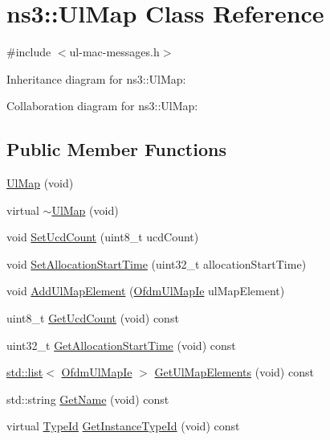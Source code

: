 \hypertarget{classns3_1_1UlMap}{}\section{ns3\+:\+:Ul\+Map Class Reference}
\label{classns3_1_1UlMap}


{\ttfamily \#include $<$ul-\/mac-\/messages.\+h$>$}



Inheritance diagram for ns3\+:\+:Ul\+Map\+:


Collaboration diagram for ns3\+:\+:Ul\+Map\+:
\subsection*{Public Member Functions}
\begin{DoxyCompactItemize}
\item 
\hyperlink{classns3_1_1UlMap_a2b5b85937a0faf66691f8a773d5a1d24}{Ul\+Map} (void)
\item 
virtual \hyperlink{classns3_1_1UlMap_afdc9021a7756c11506e0658915dcf712}{$\sim$\+Ul\+Map} (void)
\item 
void \hyperlink{classns3_1_1UlMap_a8e6ba0d4dd34afff774c28d7bc4b0222}{Set\+Ucd\+Count} (uint8\+\_\+t ucd\+Count)
\item 
void \hyperlink{classns3_1_1UlMap_a2119116e4d057fe2dc59bc2ee6bda0c8}{Set\+Allocation\+Start\+Time} (uint32\+\_\+t allocation\+Start\+Time)
\item 
void \hyperlink{classns3_1_1UlMap_a60637b23f7686167de08d43422abcad0}{Add\+Ul\+Map\+Element} (\hyperlink{classns3_1_1OfdmUlMapIe}{Ofdm\+Ul\+Map\+Ie} ul\+Map\+Element)
\item 
uint8\+\_\+t \hyperlink{classns3_1_1UlMap_ab92c61cd585ea6ab4770824655a45f55}{Get\+Ucd\+Count} (void) const 
\item 
uint32\+\_\+t \hyperlink{classns3_1_1UlMap_ae5fa32a7b7b058f2620799b8d15d47d4}{Get\+Allocation\+Start\+Time} (void) const 
\item 
\hyperlink{openflow-interface_8h_afd9bcfa176617760671b67580f536fa7}{std\+::list}$<$ \hyperlink{classns3_1_1OfdmUlMapIe}{Ofdm\+Ul\+Map\+Ie} $>$ \hyperlink{classns3_1_1UlMap_af8a25727ebe205054b2a53fea86a4ab8}{Get\+Ul\+Map\+Elements} (void) const 
\item 
std\+::string \hyperlink{classns3_1_1UlMap_ae742632b0965883a0f8f3a29629deacf}{Get\+Name} (void) const 
\item 
virtual \hyperlink{classns3_1_1TypeId}{Type\+Id} \hyperlink{classns3_1_1UlMap_aab641c7315a0cbad41e612bf276a16cf}{Get\+Instance\+Type\+Id} (void) const 

\end{DoxyCompactItemize}
